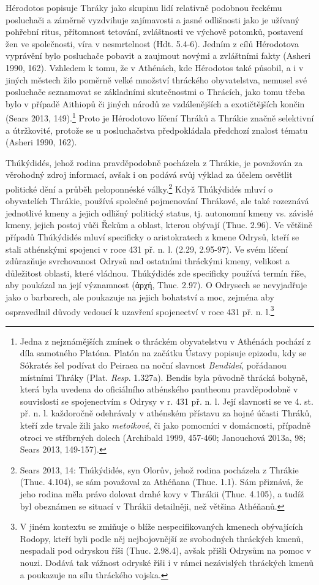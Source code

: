 Hérodotos popisuje Thráky jako skupinu lidí relativně podobnou řeckému posluchači a záměrně vyzdvihuje zajímavosti a jasné odlišnosti jako je užívaný pohřební ritus, přítomnost tetování, zvláštnosti ve výchově potomků, postavení žen ve společnosti, víra v nesmrtelnost (Hdt. 5.4-6). Jedním z cílů Hérodotova vyprávění bylo posluchače pobavit a zaujmout novými a zvláštními fakty (Asheri 1990, 162). Vzhledem k tomu, že v Athénách, kde Hérodotos také působil, a i v jiných městech žilo poměrně velké množství thráckého obyvatelstva, nemusel své posluchače seznamovat se základními skutečnostmi o Thrácích, jako tomu třeba bylo v případě Aithiopů či jiných národů ze vzdálenějších a exotičtějších končin (Sears 2013, 149).\footnote{Jedna z nejznámějších zmínek o thráckém obyvatelstvu v Athénách pochází z díla samotného Platóna. Platón na začátku Ústavy popisuje epizodu, kdy se Sókratés šel podívat do Peiraea na noční slavnost {\em Bendideí}, pořádanou místními Thráky (Plat. {\em Resp}. 1.327a). Bendis byla původně thrácká bohyně, která byla uvedena do oficiálního athénského pantheonu pravděpodobně v souvislosti se spojenectvím s Odrysy v r. 431 př. n. l. Její slavnosti se ve 4. st. př. n. l. každoročně odehrávaly v athénském přístavu za hojné účasti Thráků, kteří zde trvale žili jako {\em metoikové}, či jako pomocníci v domácnosti, případně otroci ve stříbrných dolech (Archibald 1999, 457-460; Janouchová 2013a, 98; Sears 2013, 149-157).} Proto je Hérodotovo líčení Thráků a Thrákie značně selektivní a útržkovité, protože se u posluchačstva předpokládala předchozí znalost tématu (Asheri 1990, 162).

Thúkýdidés, jehož rodina pravděpodobně pocházela z Thrákie, je považován za věrohodný zdroj informací, avšak i on podává svůj výklad za účelem osvětlit politické dění a průběh peloponnéské války.\footnote{Sears 2013, 14: Thúkýdidés, syn Olorův, jehož rodina pocházela z Thrákie (Thuc. 4.104), se sám považoval za Athéňana (Thuc. 1.1). Sám přiznává, že jeho rodina měla právo dolovat drahé kovy v Thrákii (Thuc. 4.105), a tudíž byl obeznámen se situací v Thrákii detailněji, než většina Athéňanů.} Když Thúkýdidés mluví o obyvatelích Thrákie, používá společné pojmenování Thrákové, ale také rozeznává jednotlivé kmeny a jejich odlišný politický status, tj. autonomní kmeny vs. závislé kmeny, jejich postoj vůči Řekům a oblast, kterou obývají (Thuc. 2.96). Ve většině případů Thúkýdidés mluví specificky o aristokratech z kmene Odrysů, kteří se stali athénskými spojenci v roce 431 př. n. l. (2.29, 2.95-97). Ve svém líčení zdůrazňuje svrchovanost Odrysů nad ostatními thráckými kmeny, velikost a důležitost oblasti, které vládnou. Thúkýdidés zde specificky používá termín říše, aby poukázal na její významnost (ἀρχή, Thuc. 2.97). O Odrysech se nevyjadřuje jako o barbarech, ale poukazuje na jejich bohatství a moc, zejména aby ospravedlnil důvody vedoucí k uzavření spojenectví v roce 431 př. n. l.\footnote{V jiném kontextu se zmiňuje o blíže nespecifikovaných kmenech obývajících Rodopy, kteří byli podle něj nejbojovnější ze svobodných thráckých kmenů, nespadali pod odryskou říši (Thuc. 2.98.4), avšak přišli Odrysům na pomoc v nouzi. Dodává tak vážnost odryské říši i v rámci nezávislých thráckých kmenů a poukazuje na sílu thráckého vojska.}

